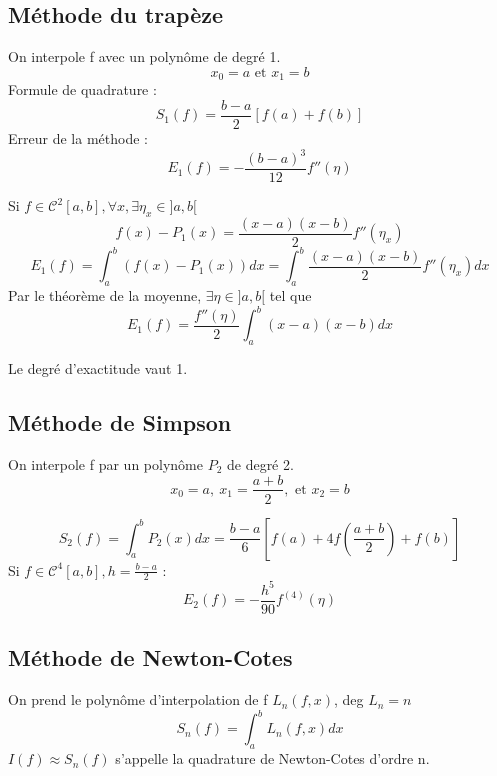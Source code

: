 
\subsection{Méthode du trapèze}
On interpole f avec un polynôme de degré 1. \[x_0=a \text{ et } x_1=b\]
Formule de quadrature : \[S_1(f)=\frac{b-a}{2}[f(a)+f(b)]\]
Erreur de la méthode : \[E_1(f)=-\frac{(b-a)^3}{12}f''(\eta)\]
\begin{dem}
Si $f\in\mathcal{C}^2[a,b],\forall x,\exists\eta_x\in]a,b[$
	\[f(x)-P_1(x)=\frac{(x-a)(x-b)}{2}f''(\eta_x)\]
	\[E_1(f)=\int_a^b (f(x)-P_1(x))dx = \int_a^b \frac{(x-a)(x-b)}{2}f''(\eta_x)dx\]
Par le théorème de la moyenne, $\exists\eta\in]a,b[$ tel que \[E_1(f)=\frac{f''(\eta)}{2}\int_a^b (x-a)(x-b)dx\]
\end{dem}

Le degré d'exactitude vaut 1.

\subsection{Méthode de Simpson}
On interpole f par un polynôme $P_2$ de degré 2. \[x_0=a,\ x_1=\frac{a+b}{2},\text{ et } x_2=b\]

\[S_2(f)=\int_a^b P_2(x)dx=\frac{b-a}{6}\left[ f(a) + 4f\left(\frac{a+b}{2}\right)+f(b)\right]\]
Si $f\in\mathcal{C}^4[a,b],h=\frac{b-a}{2}$ : \[E_2(f)=-\frac{h^5}{90}f^{(4)}(\eta)\]

\subsection{Méthode de Newton-Cotes}
On prend le polynôme d'interpolation de f $L_n(f,x)$, deg $L_n=n$
\[S_n(f)=\int_a^b L_n(f,x) dx\]
$I(f)\approx S_n(f)$ s'appelle la quadrature de Newton-Cotes d'ordre n.


